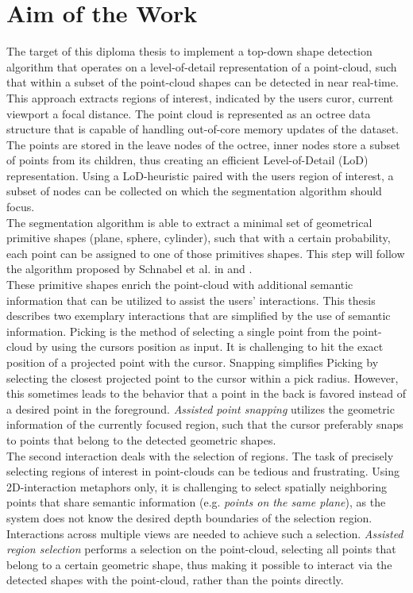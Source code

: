 \section{Aim of the Work}
\label{sec:aim}

The target of this diploma thesis to implement a top-down shape detection algorithm that operates on a level-of-detail representation of a point-cloud, such that within a subset of the point-cloud shapes can be detected in near real-time. 
This approach extracts regions of interest, indicated by the users curor, current viewport a focal distance. The point cloud is represented as an octree data structure that is capable of handling out-of-core memory updates of the dataset. The points are stored in the leave nodes of the octree, inner nodes store a subset of points from its children, thus creating an efficient Level-of-Detail (LoD) representation. Using a LoD-heuristic paired with the users region of interest, a subset of nodes can be collected on which the segmentation algorithm should focus. 
\\
The segmentation algorithm is able to extract a minimal set of geometrical primitive shapes (plane, sphere, cylinder), such that with a certain probability, each point can be assigned to one of those primitives shapes. This step will follow the algorithm proposed by Schnabel et al. in \cite{schnabel-2007-efficient} and \cite{schnabel-2007-ransac}. 
\\
These primitive shapes enrich the point-cloud with additional semantic information that can be utilized to assist the users' interactions. This thesis describes two exemplary interactions that are simplified by the use of semantic information. 
Picking is the method of selecting a single point from the point-cloud by using the cursors position as input. It is challenging to hit the exact position of a projected point with the cursor. Snapping simplifies Picking by selecting the closest projected point to the cursor within a pick radius. However, this sometimes leads to the behavior that a point in the back is favored instead of a desired point in the foreground. \textit{Assisted point snapping} utilizes the geometric information of the currently focused region, such that the cursor preferably snaps to points that belong to the detected geometric shapes. 
\\
The second interaction deals with the selection of regions. The task of precisely selecting regions of interest in point-clouds can be tedious and frustrating. Using 2D-interaction metaphors only, it is challenging to select spatially neighboring points that share semantic information (e.g. \textit{points on the same plane}), as the system does not know the desired depth boundaries of the selection region. Interactions across multiple views are needed to achieve such a selection. \textit{Assisted region selection} performs a selection on the point-cloud, selecting all points that belong to a certain geometric shape, thus making it possible to interact via the detected shapes with the point-cloud, rather than the points directly. 